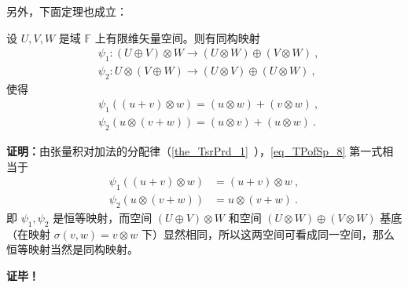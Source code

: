 另外，下面定理也成立：
\begin{theorem}{}
设 $U,V,W$ 是域 $\mathbb F$ 上有限维矢量空间。则有同构映射
\begin{equation}
\begin{aligned}
&\psi_1:(U\oplus V)\otimes W\rightarrow (U\otimes W)\oplus (V\otimes W) ~,\\
&\psi_2:U\otimes(V\oplus W)\rightarrow (U\otimes V)\oplus (U\otimes W)~,
\end{aligned}
\end{equation}
使得
\begin{equation}\label{eq_TPofSp_8}
\begin{aligned}
&\psi_1((u+v)\otimes w)=(u\otimes w)+ (v\otimes w)~,\\
&\psi_2(u\otimes (v+ w))=(u\otimes v)+ (u\otimes w) ~.
\end{aligned}
\end{equation}
\end{theorem}
\textbf{证明：}由张量积对加法的分配律（\autoref{the_TsrPrd_1}~），\autoref{eq_TPofSp_8} 第一式相当于
\begin{equation}
\begin{aligned}
\psi_1((u+v)\otimes w)&=(u+v)\otimes w~,\\
\psi_2(u\otimes(v+w))&=u\otimes(v+w)~.
\end{aligned}
\end{equation}
即 $\psi_1,\psi_2$ 是恒等映射，而空间 $(U\oplus V)\otimes W$ 和空间 $(U\otimes W)\oplus (V\otimes W) $ 基底（在映射 $\sigma(v,w)=v\otimes w$ 下）显然相同，所以这两空间可看成同一空间，那么恒等映射当然是同构映射。

\textbf{证毕！}
